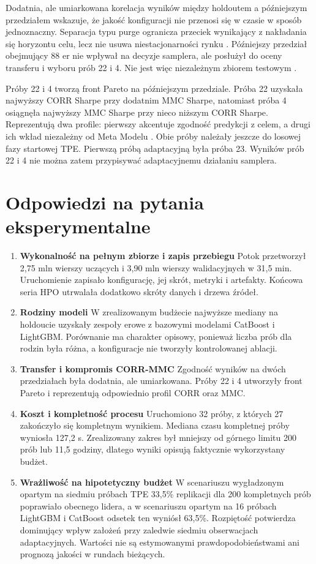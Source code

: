 Dodatnia, ale umiarkowana korelacja wyników między holdoutem a późniejszym
przedziałem wskazuje, że jakość konfiguracji nie przenosi się w czasie w sposób
jednoznaczny. Separacja typu purge ogranicza przeciek wynikający z nakładania
się horyzontu celu, lecz nie usuwa niestacjonarności rynku
. Późniejszy przedział obejmujący 88 er nie wpływał na
decyzje samplera, ale posłużył do oceny transferu i wyboru prób 22 i 4. Nie jest
więc niezależnym zbiorem testowym .

Próby 22 i 4 tworzą front Pareto na późniejszym przedziale. Próba 22 uzyskała
najwyższy CORR Sharpe przy dodatnim MMC Sharpe, natomiast próba 4 osiągnęła
najwyższy MMC Sharpe przy nieco niższym CORR Sharpe. Reprezentują dwa profile:
pierwszy akcentuje zgodność predykcji z celem, a drugi ich wkład niezależny od
Meta Modelu . Obie próby należały jeszcze do
losowej fazy startowej TPE. Pierwszą próbą adaptacyjną była próba 23. Wyników
prób 22 i 4 nie można zatem przypisywać adaptacyjnemu działaniu samplera.

\section{Odpowiedzi na pytania eksperymentalne}
\begin{enumerate}\item \textbf{Wykonalność na pełnym zbiorze i zapis przebiegu} Potok przetworzył
    2,75 mln wierszy uczących i 3,90 mln wierszy walidacyjnych w 31,5 min.
    Uruchomienie zapisało konfigurację, jej skrót, metryki i artefakty. Końcowa
    seria HPO utrwalała dodatkowo skróty danych i drzewa źródeł.
\item \textbf{Rodziny modeli} W zrealizowanym budżecie najwyższe mediany
    na holdoucie uzyskały zespoły erowe z bazowymi modelami CatBoost i LightGBM.
    Porównanie ma charakter opisowy, ponieważ liczba prób dla rodzin była różna,
    a konfiguracje nie tworzyły kontrolowanej ablacji.
\item \textbf{Transfer i kompromis CORR-MMC} Zgodność wyników na dwóch
    przedziałach była dodatnia, ale umiarkowana. Próby 22 i 4 utworzyły front
    Pareto i reprezentują odpowiednio profil CORR oraz MMC.
\item \textbf{Koszt i kompletność procesu} Uruchomiono 32 próby, z których
    27 zakończyło się kompletnym wynikiem. Mediana czasu kompletnej próby
    wyniosła 127,2 s. Zrealizowany zakres był mniejszy od górnego limitu
    200 prób lub 11,5 godziny, dlatego wyniki opisują faktycznie wykorzystany budżet.
\item \textbf{Wrażliwość na hipotetyczny budżet} W scenariuszu wygładzonym
    opartym na siedmiu próbach TPE 33,5\% replikacji dla 200 kompletnych prób
    poprawiało obecnego lidera, a w scenariuszu opartym na 16 próbach LightGBM
    i CatBoost odsetek ten wyniósł 63,5\%. Rozpiętość potwierdza dominujący wpływ
    założeń przy zaledwie siedmiu obserwacjach adaptacyjnych. Wartości nie są
    estymowanymi prawdopodobieństwami ani prognozą jakości w rundach bieżących.\end{enumerate}

